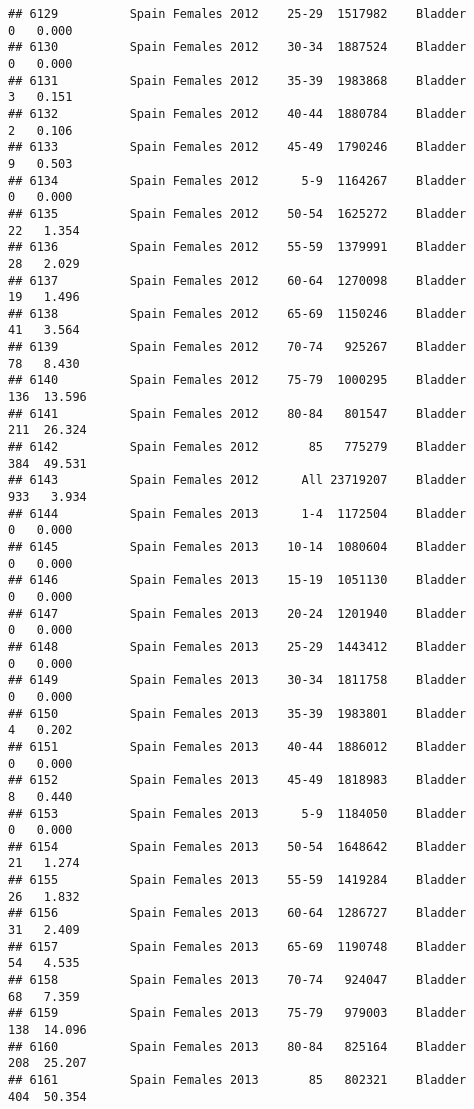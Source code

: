 \documentclass[
]{article}
\begin{document}
\begin{verbatim}
## 6129          Spain Females 2012    25-29  1517982    Bladder      0   0.000
## 6130          Spain Females 2012    30-34  1887524    Bladder      0   0.000
## 6131          Spain Females 2012    35-39  1983868    Bladder      3   0.151
## 6132          Spain Females 2012    40-44  1880784    Bladder      2   0.106
## 6133          Spain Females 2012    45-49  1790246    Bladder      9   0.503
## 6134          Spain Females 2012      5-9  1164267    Bladder      0   0.000
## 6135          Spain Females 2012    50-54  1625272    Bladder     22   1.354
## 6136          Spain Females 2012    55-59  1379991    Bladder     28   2.029
## 6137          Spain Females 2012    60-64  1270098    Bladder     19   1.496
## 6138          Spain Females 2012    65-69  1150246    Bladder     41   3.564
## 6139          Spain Females 2012    70-74   925267    Bladder     78   8.430
## 6140          Spain Females 2012    75-79  1000295    Bladder    136  13.596
## 6141          Spain Females 2012    80-84   801547    Bladder    211  26.324
## 6142          Spain Females 2012       85   775279    Bladder    384  49.531
## 6143          Spain Females 2012      All 23719207    Bladder    933   3.934
## 6144          Spain Females 2013      1-4  1172504    Bladder      0   0.000
## 6145          Spain Females 2013    10-14  1080604    Bladder      0   0.000
## 6146          Spain Females 2013    15-19  1051130    Bladder      0   0.000
## 6147          Spain Females 2013    20-24  1201940    Bladder      0   0.000
## 6148          Spain Females 2013    25-29  1443412    Bladder      0   0.000
## 6149          Spain Females 2013    30-34  1811758    Bladder      0   0.000
## 6150          Spain Females 2013    35-39  1983801    Bladder      4   0.202
## 6151          Spain Females 2013    40-44  1886012    Bladder      0   0.000
## 6152          Spain Females 2013    45-49  1818983    Bladder      8   0.440
## 6153          Spain Females 2013      5-9  1184050    Bladder      0   0.000
## 6154          Spain Females 2013    50-54  1648642    Bladder     21   1.274
## 6155          Spain Females 2013    55-59  1419284    Bladder     26   1.832
## 6156          Spain Females 2013    60-64  1286727    Bladder     31   2.409
## 6157          Spain Females 2013    65-69  1190748    Bladder     54   4.535
## 6158          Spain Females 2013    70-74   924047    Bladder     68   7.359
## 6159          Spain Females 2013    75-79   979003    Bladder    138  14.096
## 6160          Spain Females 2013    80-84   825164    Bladder    208  25.207
## 6161          Spain Females 2013       85   802321    Bladder    404  50.354

\end{verbatim}
\end{document}
